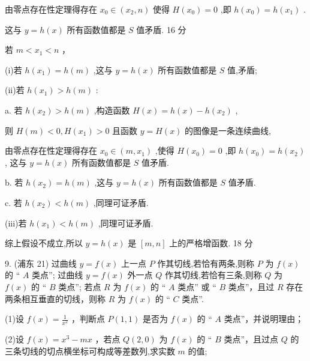 \documentclass[10pt]{article}
\newcommand*\circled[1]{\tikz[baseline=(char.base)]{\node[shape=circle,draw,inner sep=1.5pt] (char) {\small #1};}}
\begin{document}
由零点存在性定理得存在 \({x}_{0} \in  \left( {{x}_{2},n}\right)\) 使得 \(H\left( {x}_{0}\right)  = 0\) ,即 \(h\left( {x}_{0}\right)  = h\left( {x}_{1}\right)\) .

这与 \(y = h\left( x\right)\) 所有函数值都是 \(S\) 值矛盾. 16 分

 \circled{2}  若 \(m < {x}_{1} < n\) ，

(i)若 \(h\left( {x}_{1}\right)  = h\left( m\right)\) ,这与 \(y = h\left( x\right)\) 所有函数值都是 \(S\) 值,矛盾;

(ii)若 \(h\left( {x}_{1}\right)  > h\left( m\right)\) :

a. 若 \(h\left( {x}_{2}\right)  > h\left( m\right)\) ,构造函数 \(H\left( x\right)  = h\left( x\right)  - h\left( {x}_{2}\right)\) ,

则 \(H\left( m\right)  < 0,H\left( {x}_{1}\right)  > 0\) 且函数 \(y = H\left( x\right)\) 的图像是一条连续曲线,

由零点存在性定理得存在 \({x}_{0} \in  \left( {m,{x}_{1}}\right)\) ,使得 \(H\left( {x}_{0}\right)  = 0\) ,即 \(h\left( {x}_{0}\right)  = h\left( {x}_{2}\right)\) , 这与 \(y = h\left( x\right)\) 所有函数值都是 \(S\) 值矛盾.

b. 若 \(h\left( {x}_{2}\right)  = h\left( m\right)\) ,这与 \(y = h\left( x\right)\) 所有函数值都是 \(S\) 值矛盾.

c. 若 \(h\left( {x}_{2}\right)  < h\left( m\right)\) ,同理可证矛盾.

(iii)若 \(h\left( {x}_{1}\right)  < h\left( m\right)\) ,同理可证矛盾.

综上假设不成立,所以 \(y = h\left( x\right)\) 是 \(\left\lbrack  {m,n}\right\rbrack\) 上的严格增函数. 18 分

9. (浦东 21) 过曲线 \(y = f\left( x\right)\) 上一点 \(P\) 作其切线,若恰有两条,则称 \(P\) 为 \(f\left( x\right)\) 的 “ \(A\) 类点”; 过曲线 \(y = f\left( x\right)\) 外一点 \(Q\) 作其切线,若恰有三条,则称 \(Q\) 为 \(f\left( x\right)\) 的 “ \(B\) 类点”; 若点 \(R\) 为 \(f\left( x\right)\) 的 “ \(A\) 类点” 或 “ \(B\) 类点”，且过 \(R\) 存在两条相互垂直的切线，则称 \(R\) 为 \(f\left( x\right)\) 的 “ \(C\) 类点”.

(1)设 \(f\left( x\right)  = \frac{1}{{x}^{2}}\) ，判断点 \(P\left( {1,1}\right)\) 是否为 \(f\left( x\right)\) 的 “ \(A\) 类点”，并说明理由；

(2)设 \(f\left( x\right)  = {x}^{3} - {mx}\) ，若点 \(Q\left( {2,0}\right)\) 为 \(f\left( x\right)\) 的 “ \(B\) 类点”，且过点 \(Q\) 的三条切线的切点横坐标可构成等差数列,求实数 \(m\) 的值;
\end{document}

